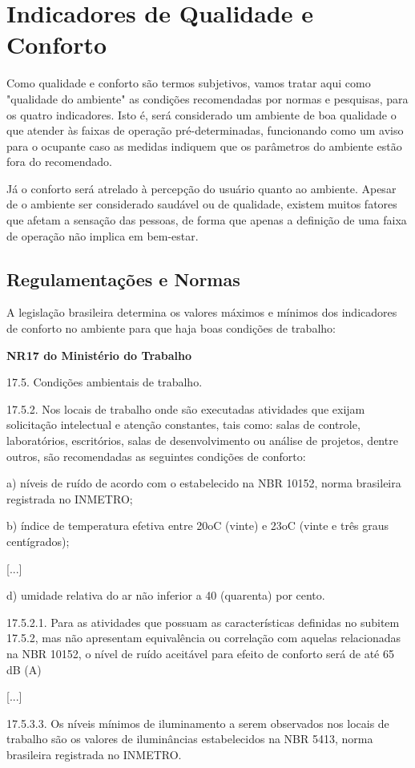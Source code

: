 \documentclass[../monografia.tex]{subfiles}
\begin{document}
\section{Indicadores de Qualidade e Conforto} 


Como qualidade e conforto são termos subjetivos, vamos tratar aqui como "qualidade do ambiente" as condições recomendadas por normas e pesquisas, para os quatro indicadores. Isto é, será considerado um ambiente de boa qualidade o que atender às faixas de operação pré-determinadas, funcionando como um aviso para o ocupante caso as medidas indiquem que os parâmetros do ambiente estão fora do recomendado. 

Já o conforto será atrelado à percepção do usuário quanto ao ambiente. Apesar de o ambiente ser considerado saudável ou de qualidade, existem muitos fatores que afetam a sensação das pessoas, de forma que apenas a definição de uma faixa de operação não implica em bem-estar. 

\subsection{Regulamentações e Normas} %

A legislação brasileira determina os valores máximos e mínimos dos indicadores de conforto no ambiente para que haja boas condições de trabalho: 

\begin{citacaoLonga} %
\textbf{NR17 do Ministério do Trabalho} \cite{NR17}

17.5. Condições ambientais de trabalho.

17.5.2. Nos locais de trabalho onde são executadas atividades que exijam solicitação intelectual e atenção constantes, tais como: salas de controle, laboratórios, escritórios, salas de desenvolvimento ou análise de projetos, dentre outros, são recomendadas as seguintes condições de conforto:

a) níveis de ruído de acordo com o estabelecido na NBR 10152, norma brasileira registrada no INMETRO;

b) índice de temperatura efetiva entre 20oC (vinte) e 23oC (vinte e três graus centígrados);

[...]

d) umidade relativa do ar não inferior a 40 (quarenta) por cento.

17.5.2.1. Para as atividades que possuam as características definidas no subitem 17.5.2, mas não apresentam equivalência ou correlação com aquelas relacionadas na NBR 10152, o nível de ruído aceitável para efeito de conforto será de até 65 dB (A)

[...]

17.5.3.3. Os níveis mínimos de iluminamento a serem observados nos locais de trabalho são os valores de iluminâncias estabelecidos na NBR 5413, norma brasileira registrada no INMETRO.
\end{citacaoLonga}
\end{document}
